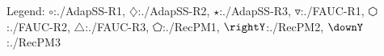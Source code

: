 Legend: {\color{NavyBlue}$\circ$}:./AdapSS-R1, {\color{Magenta}$\diamondsuit$}:./AdapSS-R2, {\color{Orange}$\star$}:./AdapSS-R3, {\color{CornflowerBlue}$\triangledown$}:./FAUC-R1, {\color{red}$\varhexagon$}:./FAUC-R2, {\color{YellowGreen}$\triangle$}:./FAUC-R3, {\color{cyan}$\pentagon$}:./RecPM1, {\color{GreenYellow}$\rightY$}:./RecPM2, {\color{ForestGreen}$\downY$}:./RecPM3
